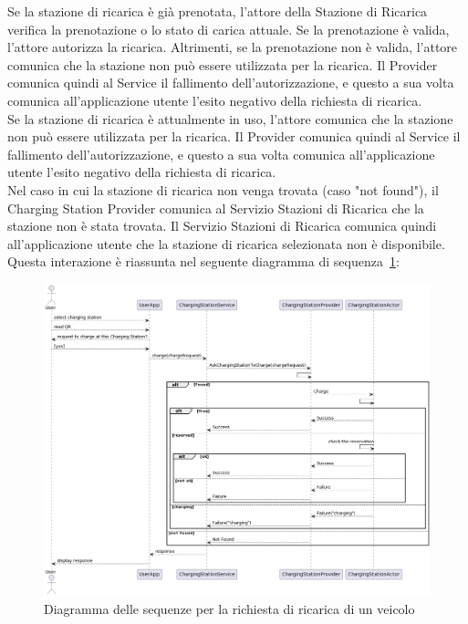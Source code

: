 Se la stazione di ricarica è già prenotata, l'attore della Stazione di Ricarica verifica
la prenotazione o lo stato di carica attuale. Se la prenotazione è valida, l'attore
autorizza la ricarica. Altrimenti, se la prenotazione non è valida, l'attore comunica
che la stazione non può essere utilizzata per la ricarica. Il Provider comunica quindi
al Service il fallimento dell'autorizzazione, e questo a sua volta comunica all'applicazione
utente l'esito negativo della richiesta di ricarica.\\

Se la stazione di ricarica è attualmente in uso, l'attore comunica che la stazione non può
essere utilizzata per la ricarica. Il Provider comunica quindi al Service il fallimento
dell'autorizzazione, e questo a sua volta comunica all'applicazione utente l'esito negativo
della richiesta di ricarica.\\

Nel caso in cui la stazione di ricarica non venga trovata (caso "not found"), il Charging Station Provider
comunica al Servizio Stazioni di Ricarica che la stazione non è stata trovata.
Il Servizio Stazioni di Ricarica comunica quindi all'applicazione utente che la stazione di
ricarica selezionata non è disponibile.\\

Questa interazione è riassunta nel seguente diagramma di sequenza \ref{fig:charge}:

\begin{figure}[!htbp]
    \centering
    \includegraphics[width=\textwidth]{images/charge.png}
    \caption{Diagramma delle sequenze per la richiesta di ricarica di un veicolo}
    \label{fig:charge}
\end{figure}
\clearpage

